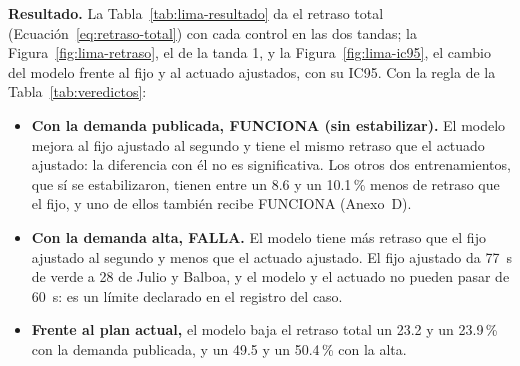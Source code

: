 \noindent\textbf{Resultado.} La Tabla~\ref{tab:lima-resultado} da el
retraso total (Ecuación~\ref{eq:retraso-total}) con cada control en las
dos tandas; la Figura~\ref{fig:lima-retraso}, el de la tanda 1, y la
Figura~\ref{fig:lima-ic95}, el cambio del modelo frente al fijo y al
actuado ajustados, con su IC95. Con la regla de la
Tabla~\ref{tab:veredictos}:
\begin{itemize}
  \item \textbf{Con la demanda publicada, FUNCIONA (sin estabilizar).}
    El modelo mejora al fijo ajustado al segundo y tiene el mismo
    retraso que el actuado ajustado: la diferencia con él no es
    significativa. Los otros dos entrenamientos, que sí se
    estabilizaron, tienen entre un 8.6 y un 10.1\,\% menos de retraso
    que el fijo, y uno de ellos también recibe FUNCIONA (Anexo~D).
  \item \textbf{Con la demanda alta, FALLA.} El modelo tiene más retraso
    que el fijo ajustado al segundo y menos que el actuado ajustado. El
    fijo ajustado da 77~s de verde a 28 de Julio y Balboa, y el modelo y
    el actuado no pueden pasar de 60~s: es un límite declarado en el
    registro del caso.
  \item \textbf{Frente al plan actual,} el modelo baja el retraso total
    un 23.2 y un 23.9\,\% con la demanda publicada, y un 49.5 y un
    50.4\,\% con la alta.
\end{itemize}

